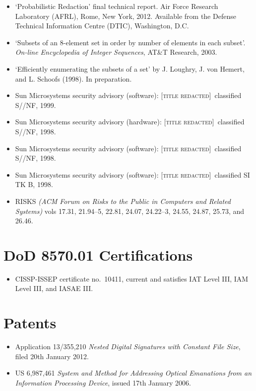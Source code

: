 \documentclass[letterpaper]{article}
\newcommand{\redacted}{\textsc{[title redacted]}}
\begin{document}
\begin{itemize}
	\item `Probabilistic Redaction' final technical report. Air Force Research
		Laboratory (AFRL), Rome, New York, 2012.  Available from the Defense Technical
		Information Centre (DTIC), Washington, D.C.

	\item `Subsets of an 8-element set in order by number of elements in each
		subset'. \emph{On-line Encyclopedia of Integer Sequences}, AT\&T Research, 2003.

	\item `Efficiently enumerating the subsets of a set' by J. Loughry, J. von Hemert,
		and L. Schoofs (1998).  In preparation.

    \item Sun Microsystems security advisory (software): \redacted\ classified S//NF, 1999.
	\item Sun Microsystems security advisory (hardware): \redacted\ classified S//NF, 1998.
	\item Sun Microsystems security advisory (software): \redacted\ classified S//NF, 1998.
	\item Sun Microsystems security advisory (software): \redacted\ classified SI TK B, 1998.

    \item RISKS \emph{(ACM Forum on Risks to the Public in Computers
    and Related Systems)} vols 17.31, 21.94--5, 22.81, 24.07,
    24.22--3, 24.55, 24.87, 25.73, and 26.46.
\end{itemize}

\section*{DoD 8570.01 Certifications}

\begin{itemize}
	\item CISSP-ISSEP certificate no.\ 10411, current and satisfies IAT Level III,
		IAM Level III, and IASAE III.
\end{itemize}

\section*{Patents} %

\begin{itemize}
	\item Application 13/355,210 \emph{Nested Digital Signatures with Constant File Size},
		filed 20th January 2012.

    \item US 6,987,461 \emph{System and Method for Addressing Optical
		Emanations from an Information Processing Device}, issued 17th January 2006.
\end{itemize}
\end{document}
